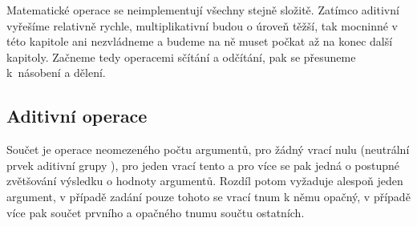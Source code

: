 Matematické operace se neimplementují všechny stejně složitě. Zatímco aditivní vyřešíme relativně rychle, multiplikativní budou o úroveň těžší, tak mocninné v této kapitole ani nezvládneme a budeme na ně muset počkat až na konec další kapitoly. Začneme tedy operacemi sčítání a odčítání, pak se přesuneme k~násobení a dělení.

\subsection{Aditivní operace}
Součet je operace neomezeného počtu argumentů, pro žádný vrací nulu (neutrální prvek aditivní grupy \cite{RachALG1}), pro jeden vrací tento a pro více se pak jedná o postupné zvětšování výsledku o hodnoty argumentů. Rozdíl potom vyžaduje alespoň jeden argument, v případě zadání pouze tohoto se vrací tnum k němu opačný, v případě více pak součet prvního a opačného tnumu součtu ostatních.

